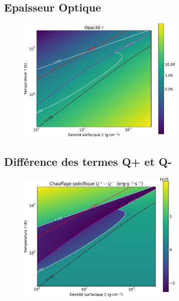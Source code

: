 \documentclass[french]{beamer}
\begin{document}
\begin{frame}
\section{Epaisseur Optique}
\begin{figure}[htb!]
\includegraphics[width=8cm]{figures/tau_map.pdf}
\end{figure}
\end{frame}


\begin{frame}
\section{Différence des termes Q+ et Q-}
\begin{figure}[htb!]
\includegraphics[width=8cm]{figures/Qmap.pdf}
\end{figure}
\end{frame}
\end{document}
